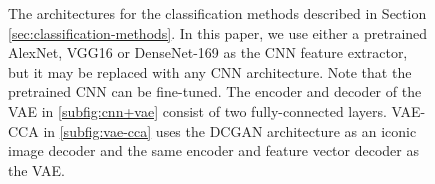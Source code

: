 \begin{figure}[t]
    \centering
    \caption{The architectures for the classification methods described in Section \ref{sec:classification-methods}. In this paper, we use either a pretrained AlexNet, VGG16 or DenseNet-169 as the CNN feature extractor, but it may be replaced with any CNN architecture. Note that the pretrained CNN can be fine-tuned. The encoder and decoder of the VAE in \ref{subfig:cnn+vae} consist of two fully-connected layers. VAE-CCA in \ref{subfig:vae-cca} uses the DCGAN architecture as an iconic image decoder and the same encoder and feature vector decoder as the VAE.   }
    \label{fig:classification-methods}
\end{figure}